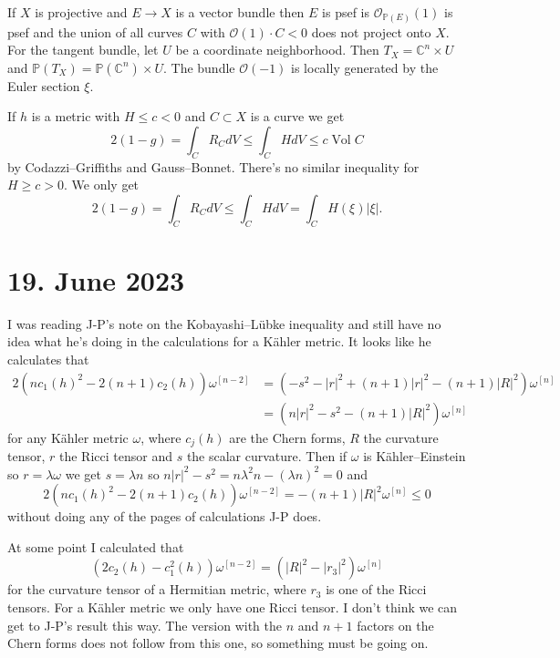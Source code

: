 \documentclass[11pt]{amsart}
\theoremstyle{definition}
\newcommand{\kk}[1]{\mathbb{#1}}
\newcommand{\cc}[1]{\mathcal{#1}}
\def\^#1{^{[#1]}}
\DeclareMathOperator{\Vol}{Vol}
\begin{document}
If $X$ is projective and $E \to X$ is a vector bundle then $E$ is psef
is $\cc O_{\kk P(E)}(1)$ is psef and the union of all curves $C$
with $\cc O(1) \cdot C < 0$ does not project onto $X$.
For the tangent bundle, let $U$ be a coordinate neighborhood.
Then $T_X = \kk C^n \times U$ and $\kk P(T_X) = \kk P(\kk C^n) \times U$.
The bundle $\cc O(-1)$ is locally generated by the Euler section $\xi$.

If $h$ is a metric with $H \leq c < 0$ and $C \subset X$ is a curve we get
$$
2(1-g)
= \int_C R_{C} dV
\leq \int_C H dV
\leq c \Vol C
$$
by Codazzi--Griffiths and Gauss--Bonnet.
There's no similar inequality for $H \geq c > 0$.
We only get
$$
2(1-g)
= \int_C R_C dV
\leq \int_C H dV
= \int_C H(\xi) |\xi|.
$$




\section{19. June 2023}

I was reading J-P's note on the Kobayashi--L\"ubke inequality and still have no
idea what he's doing in the calculations for a K\"ahler metric.
It looks like he calculates that
\begin{align*}
2(nc_1(h)^2 - 2(n{+}1) c_2(h)) \omega\^{n-2}
&= (-s^2 -|r|^2 + (n{+}1)|r|^2 - (n{+}1)|R|^2) \omega\^n
\\
&= (n|r|^2 - s^2 - (n+1)|R|^2) \omega\^n
\end{align*}
for any K\"ahler metric $\omega$, where $c_j(h)$ are the Chern forms,
$R$ the curvature tensor, $r$ the Ricci tensor and $s$ the scalar curvature.
Then if $\omega$ is K\"ahler--Einstein so $r = \lambda \omega$ we get $s =
\lambda n$ so $n |r|^2 - s^2 = n \lambda^2 n - (\lambda n)^2 = 0$ and
$$
2(nc_1(h)^2 - 2(n{+}1) c_2(h)) \omega\^{n-2}
= -(n+1)|R|^2 \omega\^n \leq 0
$$
without doing any of the pages of calculations J-P does.

At some point I calculated that
$$
(2c_2(h) -c_1^2(h)) \omega\^{n-2}
= (|R|^2 - |r_3|^2) \omega\^n
$$
for the curvature tensor of a Hermitian metric, where $r_3$ is one of the Ricci
tensors. For a K\"ahler metric we only have one Ricci tensor.
I don't think we can get to J-P's result this way.
The version with the $n$ and $n+1$ factors on the Chern forms does not follow
from this one, so something must be going on.

\def\fip{\frac{i}{2\pi}}
\def\tip{\tfrac{i}{2\pi}}
\end{document}
